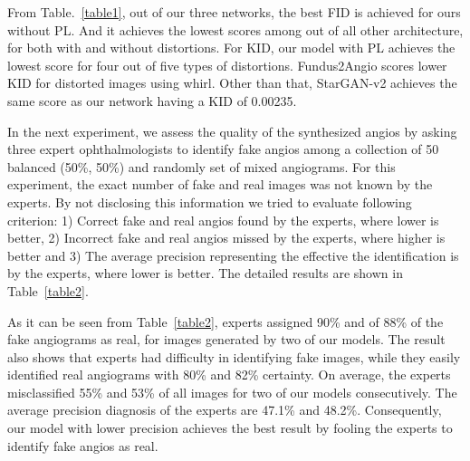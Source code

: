 \documentclass[a4paper,conference]{IEEEtran}
\begin{document}
From Table.~\ref{table1},  out of our three networks, the best FID is achieved for ours without PL.  And it achieves the lowest scores among out of all other architecture, for both with and without distortions. For KID, our model with PL achieves the lowest score for four out of five types of distortions. Fundus2Angio scores lower KID for distorted images using whirl. Other than that, StarGAN-v2 achieves the same score as our network having a KID of 0.00235.



In the next experiment, we assess the quality of the synthesized angios by asking three expert ophthalmologists to identify fake angios among a collection of 50 balanced (50\%, 50\%) and randomly set of mixed angiograms. For this experiment, the exact number of fake and real images was not known by the experts. By not disclosing this information we tried to evaluate following criterion: 1) Correct fake and real angios found by the experts, where lower is better, 2) Incorrect fake and real angios missed by the experts, where higher is better and 3) The average precision representing the effective the identification is by the experts, where lower is better. The detailed results are shown in Table~\ref{table2}.

As it can be seen from Table~\ref{table2}, experts assigned 90\% and of 88\% of the fake angiograms as real, for images generated by two of our models. The result also shows that experts had difficulty in identifying fake images, while they easily identified real angiograms with 80\% and 82\% certainty. On average, the experts misclassified 55\% and 53\% of all images for two of our models consecutively. The average precision diagnosis of the experts are 47.1\% and 48.2\%. Consequently, our model with lower precision achieves the best result by fooling the experts to identify fake angios as real.
\end{document}
